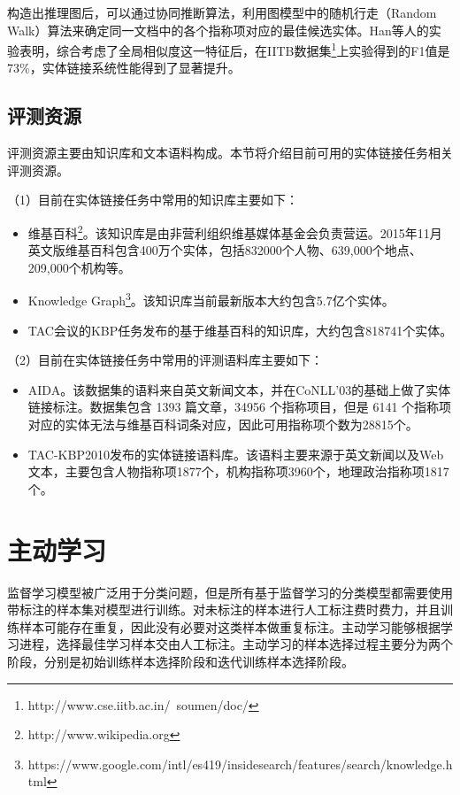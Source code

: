 构造出推理图后，可以通过协同推断算法，利用图模型中的随机行走（Random Walk）算法\cite{tong2006fast}来确定同一文档中的各个指称项对应的最佳候选实体。Han等人\cite{CELWTGBM}的实验表明，综合考虑了全局相似度这一特征后，在IITB数据集\footnote{http://www.cse.iitb.ac.in/~soumen/doc/}上实验得到的F1值是73\%，实体链接系统性能得到了显著提升。

\subsection{评测资源}
评测资源主要由知识库和文本语料构成。本节将介绍目前可用的实体链接任务相关评测资源。

（1）目前在实体链接任务中常用的知识库主要如下：
\begin{itemize}
	\item 维基百科\footnote{http://www.wikipedia.org}。该知识库是由非营利组织维基媒体基金会负责营运。2015年11月英文版维基百科包含400万个实体，包括832000个人物、639,000个地点、209,000个机构等。
	\item Knowledge Graph\footnote{https://www.google.com/intl/es419/insidesearch/features/search/knowledge.html}。该知识库当前最新版本大约包含5.7亿个实体。
	\item TAC会议的KBP任务发布的基于维基百科的知识库，大约包含818741个实体。
\end{itemize}

（2）目前在实体链接任务中常用的评测语料库主要如下：
\begin{itemize}
	\item AIDA\cite{hoffart2013discovering}。该数据集的语料来自英文新闻文本，并在CoNLL'03\cite{tjong2003introduction}的基础上做了实体链接标注。数据集包含 1393 篇文章，34956 个指称项目，但是 6141 个指称项对应的实体无法与维基百科词条对应，因此可用指称项个数为28815个。
	\item TAC-KBP2010\cite{ji2010overview}发布的实体链接语料库。该语料主要来源于英文新闻以及Web文本，主要包含人物指称项1877个，机构指称项3960个，地理政治指称项1817个。
\end{itemize}

\section{主动学习}
监督学习模型被广泛用于分类问题，但是所有基于监督学习的分类模型都需要使用带标注的样本集对模型进行训练。对未标注的样本进行人工标注费时费力，并且训练样本可能存在重复，因此没有必要对这类样本做重复标注。主动学习能够根据学习进程，选择最佳学习样本交由人工标注。主动学习的样本选择过程主要分为两个阶段，分别是初始训练样本选择阶段和迭代训练样本选择阶段。

